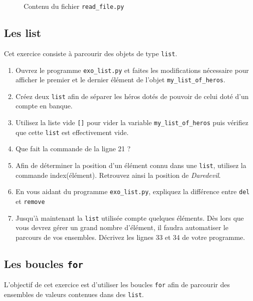 \begin{figure}  
  
  \caption{Contenu du fichier \texttt{read\_file.py}}
  \label{stat_read_file}
\end{figure}


\subsection{Les list}


Cet exercice consiste à parcourir des objets de type \texttt{list}.

\begin{enumerate}
\item Ouvrez le programme \texttt{exo\_list.py} et faites les modifications nécessaire pour
  afficher le premier et le dernier élément de l'objet \texttt{my\_list\_of\_heros}.
\item Créez deux \texttt{list} afin de séparer les héros dotés de pouvoir de
  celui doté d'un compte en banque.
\item Utilisez la liste vide \texttt{[]} pour vider la variable \texttt{my\_list\_of\_heros} puis vérifiez que cette
  \texttt{list} est effectivement vide.
\item Que fait la commande de la ligne 21 ?
\item Afin de déterminer la position d'un élément connu dans une \texttt{list}, utilisez la commande index(élément).
  Retrouvez ainsi la position de \textit{Daredevil}.

\item En vous aidant du programme \texttt{exo\_list.py}, expliquez la différence entre \texttt{del} et \texttt{remove}

\item Jusqu'à maintenant la \texttt{list} utilisée compte quelques éléments. Dès lors
  que vous devrez gérer un grand nombre d'élément, il faudra automatiser le parcours de vos ensembles.
  Décrivez les lignes 33 et 34 de votre programme.





\end{enumerate}



\subsection{Les boucles \texttt{for}}

L'objectif de cet exercice est d'utiliser les boucles \texttt{for} afin de
parcourir des ensembles de valeurs contenues dans des \texttt{list}.



